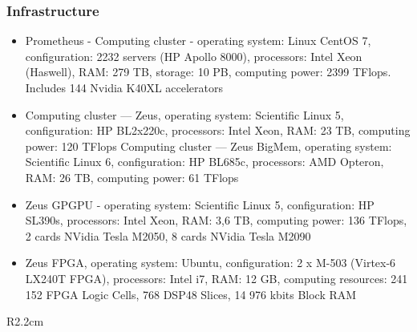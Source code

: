 \documentclass[a4paper,11pt]{article}
\begin{document}
\subsubsection*{Infrastructure}
\begin{itemize}
\item Prometheus - Computing cluster - operating system: Linux CentOS 7, configuration: 2232 servers (HP Apollo 8000), processors: Intel Xeon (Haswell), RAM: 279 TB, storage: 10 PB, computing power: 2399 TFlops. Includes 144 Nvidia K40XL accelerators
\item Computing cluster — Zeus, operating system: Scientific Linux 5, configuration: HP BL2x220c, processors: Intel Xeon, RAM: 23 TB, computing power: 120 TFlops
Computing cluster — Zeus BigMem, operating system: Scientific Linux 6, configuration: HP BL685c, processors: AMD Opteron, RAM: 26 TB, computing power: 61 TFlops 
\item Zeus GPGPU - operating system: Scientific Linux 5, configuration: HP SL390s, processors: Intel Xeon, RAM: 3,6 TB, computing power: 136 TFlops, 2 cards NVidia Tesla M2050, 8 cards NVidia Tesla M2090
\item Zeus FPGA, operating system: Ubuntu, configuration: 2 x M-503 (Virtex-6 LX240T FPGA), processors: Intel i7, RAM: 12 GB, computing resources: 241 152 FPGA Logic Cells, 768 DSP48 Slices, 14 976 kbits Block RAM
\end{itemize}


\begin{wrapfigure}{R}{2.2cm}
\vspace{-2cm}
\hfill {}
\vspace{-0.7cm}
\end{wrapfigure}
\end{document}
